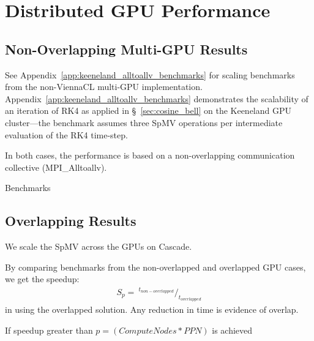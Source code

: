 \section{Distributed GPU Performance}


\subsection{Non-Overlapping Multi-GPU Results} 

See Appendix~\ref{app:keeneland_alltoallv_benchmarks} for scaling benchmarks from the non-ViennaCL multi-GPU implementation. Appendix~\ref{app:keeneland_alltoallv_benchmarks} demonstrates the scalability of an iteration of RK4 as applied in \S~\ref{sec:cosine_bell} on the Keeneland GPU cluster---the benchmark assumes three SpMV operations per intermediate evaluation of the RK4 time-step. 

In both cases, the performance is based on a non-overlapping communication collective (MPI\_Alltoallv).

Benchmarks


\subsection{Overlapping Results}
We scale the SpMV across the GPUs on Cascade.


By comparing benchmarks from the non-overlapped and overlapped GPU cases, we get the speedup: 
\begin{align*} 
S_p = \ ^{t_{non-overlapped}} /_{t_{overlapped}}
\end{align*}
in using the overlapped solution. Any reduction in time is evidence of overlap. 


If speedup greater than $p = (Compute Nodes * PPN)$ is achieved 

